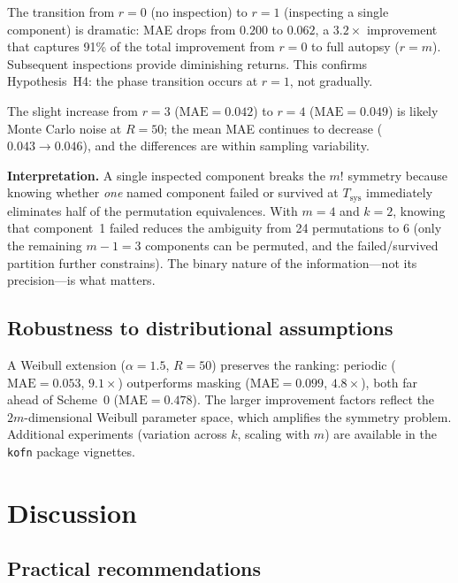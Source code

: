 \documentclass[12pt]{article}
\newcommand{\Tsys}{T_{\mathrm{sys}}}
\newcommand{\MAE}{\mathrm{MAE}}
\begin{document}
The transition from $r = 0$ (no inspection) to $r = 1$ (inspecting a
single component) is dramatic: MAE drops from $0.200$ to $0.062$, a
$3.2\times$ improvement that captures 91\% of the total improvement
from $r = 0$ to full autopsy ($r = m$).  Subsequent inspections provide diminishing
returns.  This confirms Hypothesis~H4: the phase transition occurs at
$r = 1$, not gradually.

The slight increase from $r = 3$ ($\text{MAE} = 0.042$) to
$r = 4$ ($\text{MAE} = 0.049$) is likely Monte Carlo noise at $R = 50$;
the mean MAE continues to decrease ($0.043 \to 0.046$), and the
differences are within sampling variability.

\textbf{Interpretation.}  A single inspected component breaks the $m!$
symmetry because knowing whether \emph{one} named component failed or
survived at $\Tsys$ immediately eliminates half of the permutation
equivalences.  With $m = 4$ and $k = 2$, knowing that component~1 failed
reduces the ambiguity from 24 permutations to 6 (only the remaining
$m - 1 = 3$ components can be permuted, and the failed/survived partition
further constrains).  The binary nature of the information---not its
precision---is what matters.

\subsection{Robustness to distributional assumptions}

A Weibull extension ($\alpha = 1.5$, $R = 50$) preserves the ranking:
periodic ($\MAE = 0.053$, $9.1\times$) outperforms masking
($\MAE = 0.099$, $4.8\times$), both far ahead of Scheme~0
($\MAE = 0.478$).  The larger improvement factors reflect the
$2m$-dimensional Weibull parameter space, which amplifies the symmetry
problem.  Additional experiments (variation across $k$, scaling with $m$)
are available in the \texttt{kofn} package vignettes.


\section{Discussion}\label{sec:discussion}

\subsection{Practical recommendations}\label{sec:recommendations}
\end{document}
